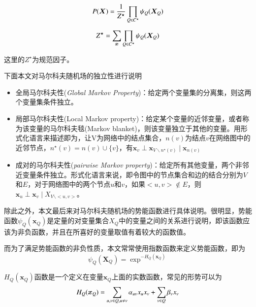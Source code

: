 \begin{equation}
	P(\bm{X}) = \frac{1}{Z^{\star}} \prod_{Q \in C^{\star}} \psi_Q(\bm{X}_Q) \\
\end{equation}


\begin{equation}
Z^{\star} = \sum_{\bm{x}} \prod_{Q \in C^{\star}} \psi_Q(\bm{X}_Q) \\
\end{equation}


这里的$Z^{\star}$为规范因子。


下面本文对马尔科夫随机场的独立性进行说明 \\
\begin{itemize}
\item 全局马尔科夫性(\textit{Global Markov Property})：给定两个变量集的分离集，则这两个变量集条件独立。 
\item 局部马尔科夫性(Local Markov property)：给定某个变量的近邻变量，或者称为该变量的马尔科夫毯(Markov blanket)，则该变量独立于其他的变量。用形式化语言来描述即为，让V为网络中的结点集合，$n(v)$为结点$v$在网络图中的近邻节点，$n^{\star}(v) = n(v)\cup \{v\}$，有$\bm{x}_v \perp \bm{x}_{V 	\backslash n^{\star}(v)} \mid \bm{x}_{n(v)} $ 

\item 成对的马尔科夫性(\textit{pairwise Markov property})：给定所有其他变量，两个非邻近变量条件独立。形式化语言来说，即令图中的节点集合和边的结合分别为$V$和$E$，对于网络图中的两个节点$u$和$v$，如果$<u,v> \notin E$，则$\bm{x}_u \perp \bm{x}_v \mid X_{V \backslash <u, v>}$。


\end{itemize}



除此之外，本文最后来对马尔科夫随机场的势能函数进行具体说明。很明显，势能函数$\psi_Q(\bm{x}_Q)$是定量的对变量集合$X_Q$中的变量之间的关系进行说明，即该函数应该为非负函数，并且在所喜好的变量取值有着较大的函数值。

而为了满足势能函数的非负性质，本文常常使用指数函数来定义势能函数，即为
\begin{equation}
\psi_Q(\bm{X}_Q) = \exp^{-H_Q(\bm{x}_Q)}
\end{equation}

$H_Q(\bm{x}_Q)$函数是一个定义在变量$\bm{x}_Q$上面的实数函数，常见的形势可以为
\begin{equation}
H_Q(\bm{x}_Q) = \sum_{u,v \in Q, u \neq v} \alpha_{uv} x_u x_v + \sum_{v \in Q} \beta_v x_v \\
\end{equation}

